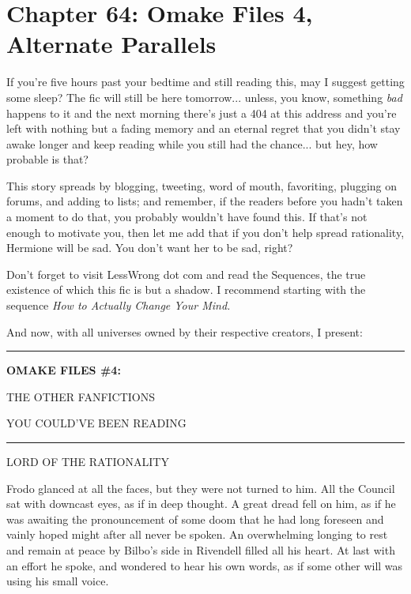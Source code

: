 \chapter{Chapter 64: Omake Files 4, Alternate Parallels}
If you're five hours past your bedtime and still reading this, may I suggest getting some sleep? The fic will still be here tomorrow... unless, you know, something \emph{bad} happens to it and the next morning there's just a 404 at this address and you're left with nothing but a fading memory and an eternal regret that you didn't stay awake longer and keep reading while you still had the chance... but hey, how probable is that?

This story spreads by blogging, tweeting, word of mouth, favoriting, plugging on forums, and adding to lists; and remember, if the readers before you hadn't taken a moment to do that, you probably wouldn't have found this. If that's not enough to motivate you, then let me add that if you don't help spread rationality, Hermione will be sad. You don't want her to be sad, right?

Don't forget to visit LessWrong dot com and read the Sequences, the true existence of which this fic is but a shadow. I recommend starting with the sequence \emph{How to Actually Change Your Mind.}

And now, with all universes owned by their respective creators, I present:

\begin{center}\rule{3in}{0.4pt}\end{center}

\textbf{OMAKE FILES \#4:}

THE OTHER FANFICTIONS

YOU COULD'VE BEEN READING

\begin{center}\rule{3in}{0.4pt}\end{center}

LORD OF THE RATIONALITY

Frodo glanced at all the faces, but they were not turned to him. All the Council sat with downcast eyes, as if in deep thought. A great dread fell on him, as if he was awaiting the pronouncement of some doom that he had long foreseen and vainly hoped might after all never be spoken. An overwhelming longing to rest and remain at peace by Bilbo's side in Rivendell filled all his heart. At last with an effort he spoke, and wondered to hear his own words, as if some other will was using his small voice.

